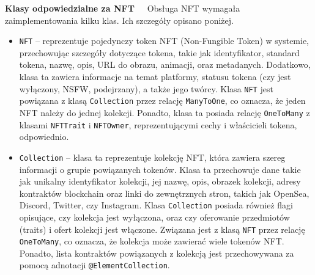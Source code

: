 \noindent \textbf{Klasy odpowiedzialne za NFT~~}
Obsługa NFT wymagała zaimplementowania kilku klas. Ich szczegóły opisano poniżej.
\begin{itemize}
	\item \texttt{NFT} -- reprezentuje pojedynczy token NFT (Non-Fungible Token) w systemie, przechowując szczegóły dotyczące tokena, takie jak identyfikator, standard tokena, nazwę, opis, URL do obrazu, animacji, oraz metadanych. Dodatkowo, klasa ta zawiera informacje na temat platformy, statusu tokena (czy jest wyłączony, NSFW, podejrzany), a także jego twórcy.\newline
Klasa \texttt{NFT} jest powiązana z klasą \texttt{Collection} przez relację \texttt{ManyToOne}, co oznacza, że jeden NFT należy do jednej kolekcji. Ponadto, klasa ta posiada relację \texttt{OneToMany} z klasami \texttt{NFTTrait} i \texttt{NFTOwner}, reprezentującymi cechy i właścicieli tokena, odpowiednio. 
	\item \texttt{Collection} -- klasa ta reprezentuje kolekcję NFT, która zawiera szereg informacji o grupie powiązanych tokenów. Klasa ta przechowuje dane takie jak unikalny identyfikator kolekcji, jej nazwę, opis, obrazek kolekcji, adresy kontraktów blockchain oraz linki do zewnętrznych stron, takich jak OpenSea, Discord, Twitter, czy Instagram.
\newline
Klasa \texttt{Collection} posiada również flagi opisujące, czy kolekcja jest wyłączona, oraz czy oferowanie przedmiotów (traits) i ofert kolekcji jest włączone. Związana jest z klasą \texttt{NFT} przez relację \texttt{OneToMany}, co oznacza, że kolekcja może zawierać wiele tokenów NFT. Ponadto, lista kontraktów powiązanych z kolekcją jest przechowywana za pomocą adnotacji \texttt{@ElementCollection}.
\end{itemize}

